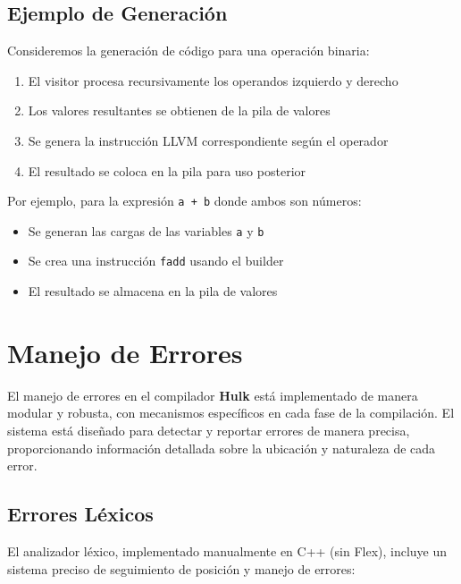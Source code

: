 \documentclass[11pt, a4paper, twoside]{article} %
\begin{document}
\subsection{Ejemplo de Generación}

Consideremos la generación de código para una operación binaria:

\begin{enumerate}
    \item El visitor procesa recursivamente los operandos izquierdo y derecho
    \item Los valores resultantes se obtienen de la pila de valores
    \item Se genera la instrucción LLVM correspondiente según el operador
    \item El resultado se coloca en la pila para uso posterior
\end{enumerate}

Por ejemplo, para la expresión \texttt{a + b} donde ambos son números:

\begin{itemize}
    \item Se generan las cargas de las variables \texttt{a} y \texttt{b}
    \item Se crea una instrucción \texttt{fadd} usando el builder
    \item El resultado se almacena en la pila de valores
\end{itemize}

\section{Manejo de Errores}

El manejo de errores en el compilador \textbf{Hulk} está implementado de manera modular y robusta, con mecanismos específicos en cada fase de la compilación. El sistema está diseñado para detectar y reportar errores de manera precisa, proporcionando información detallada sobre la ubicación y naturaleza de cada error.

\subsection{Errores Léxicos}

El analizador léxico, implementado manualmente en C++ (sin Flex), incluye un sistema preciso de seguimiento de posición y manejo de errores:
\end{document}

